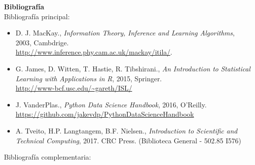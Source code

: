 \documentclass[letterpaper,10pt,onecolumn]{article}
\begin{document}
\newpage
{}
\noindent\textbf{\large {} \quad
  Bibliograf\'ia}\\[-0.2cm] 


\noindent\normalsize Bibliograf\'ia principal:

\begin{itemize}
\item D. J. MacKay., \textit{Information Theory, Inference and
  Learning Algorithms}, 2003,
  Cambdrige. \\
  \url{http://www.inference.phy.cam.ac.uk/mackay/itila/}.
  \\[-0.6cm]  
\item G. James, D. Witten, T. Hastie, R. Tibshirani., \textit{An
  Introduction to Statistical Learning with Applications in R}, 2015,
  Springer. \\
  \url{http://www-bcf.usc.edu/~gareth/ISL/} \\[-0.6cm] 
\item J. VanderPlas., \textit{Python Data Science Handbook}, 2016,
  O'Reilly.\\
  \url{https://github.com/jakevdp/PythonDataScienceHandbook} 
  \\[-0.6cm] 
\item A. Tveito, H.P. Langtangem, B.F. Nielsen., \textit{Introduction
  to Scientific and Technical Computing}, 2017. CRC Press. (Biblioteca
  General - 502.85 I576)\\[-0.2cm] 
\end{itemize} 

\noindent\normalsize Bibliograf\'ia complementaria:
\end{document}
